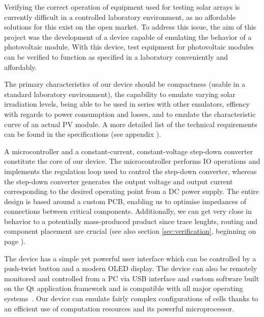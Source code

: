 

Verifying the correct operation of equipment  used for testing solar arrays is
currently difficult in  a controlled laboratory environment,  as no affordable
solutions for this exist on the open market. To address this issue, the aim of
this project was the development of a device capable of emulating the behavior
of a  photovoltaic module. With this  device, test equipment  for photovoltaic
modules can be verified to function  as specified in a laboratory conveniently
and affordably.

The primary characteristics  of our device should be compactness  (usable in a
standard  laboratory environment),  the  capability to  emulate varying  solar
irradiation levels,  being able  to be  used in  series with  other emulators,
effiency with  regards to  power consumption  and losses,  and to  emulate the
characteristic  curve of  an actual  PV module. A  more detailed  list of  the
technical  requirements  can be  found  in  the specifications  (see  appendix
). %

A microcontroller and a constant-current, constant-voltage step-down converter
constitute the core of our device.  The microcontroller performs IO operations
and implements  the regulation loop  used to control the  step-down converter,
whereas  the  step-down converter  generates  the  output voltage  and  output
current  corresponding  to  the  desired  operating  point  from  a  DC  power
supply. The  entire design  is  based  around a  custom  PCB,  enabling us  to
optimise impedances of  connections between critical components. Additionally,
we can get very close in behavior to a potentially mass-produced product since
trace lenghts, routing  and component placement are crucial  (see also section
\ref{sec:verification}, beginning on page \pageref{sec:verification}).

The device has a simple yet powerful user interface which can be controlled by
a push-twist button and a modern OLED display. The device can also be remotely
monitored and controlled from a PC via USB interface and custom software built
on the  Qt application framework  and is  compatible with all  major operating
systems~\cite{ref:qt}.  Our  device can emulate fairly  complex configurations
of cells thanks to an efficient  use of computation resources and its powerful
microprocessor.


